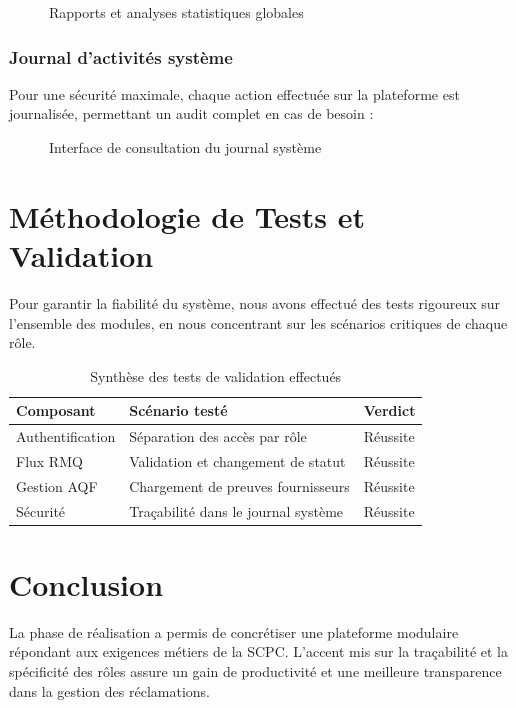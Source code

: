 \begin{figure}[H]
    \centering
    \caption{Rapports et analyses statistiques globales}
    \label{fig:admin-stats}
\end{figure}

\subsubsection{Journal d'activités système}
Pour une sécurité maximale, chaque action effectuée sur la plateforme est journalisée, permettant un audit complet en cas de besoin :

\begin{figure}[H]
    \centering
    \caption{Interface de consultation du journal système}
    \label{fig:admin-logs}
\end{figure}

\section{Méthodologie de Tests et Validation}
Pour garantir la fiabilité du système, nous avons effectué des tests rigoureux sur l'ensemble des modules, en nous concentrant sur les scénarios critiques de chaque rôle.

\begin{table}[H]
\centering
\begin{tabular}{|l|l|l|}
\hline
\textbf{Composant} & \textbf{Scénario testé} & \textbf{Verdict} \\ \hline
Authentification & Séparation des accès par rôle & Réussite \\ \hline
Flux RMQ & Validation et changement de statut & Réussite \\ \hline
Gestion AQF & Chargement de preuves fournisseurs & Réussite \\ \hline
Sécurité & Traçabilité dans le journal système & Réussite \\ \hline
\end{tabular}
\caption{Synthèse des tests de validation effectués}
\label{tab:tests_final}
\end{table}

\section*{Conclusion}
La phase de réalisation a permis de concrétiser une plateforme modulaire répondant aux exigences métiers de la SCPC. L'accent mis sur la traçabilité et la spécificité des rôles assure un gain de productivité et une meilleure transparence dans la gestion des réclamations.
